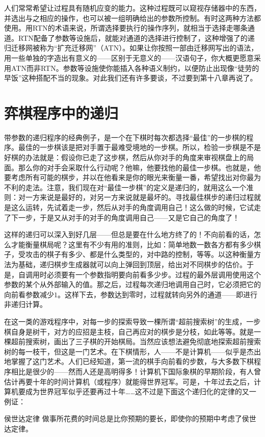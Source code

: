 人们常常希望让过程具有随机应变的能力。这种过程既可以窥视存储器中的东西，并选出与之相应的操作，也可以被一组明确给出的参数所控制。有时这两种方法都使用。用RTN的术语来说，所谓选择要执行的操作序列，就相当于选择走哪条通道。RTN配备了参数等设施后，就能对通道的选择进行控制了，这种增强了的递归迁移网被称为“扩充迁移网”（ATN）。如果让你按照一部由迁移网写出的语法，用一些单独的字造出有意义的——区别于无意义的——汉语句子，你大概更愿意采用ATN而非RTN。参数等设施使你能插入各种语义制约，以便防止出现像“徒劳的早饭”这种搭配不当的现象。对此我们还有许多要谈，不过要到第十八章再说了。

\section{弈棋程序中的递归}

带参数的递归程序的经典例子，是一个在下棋时每次都选择“最佳”的一步棋的程序。最佳的一步棋该是把对手置于最难受境地的一步棋。所以，检验一步棋是不是好棋的办法就是：假设你已走了这步棋，然后从你对手的角度来审视棋盘上的局面。那么你的对手会采取什么行动呢？他嘛，他要找他的最佳一步棋。也就是，他要考虑所有可能的棋步，并以在他看来是你的眼光来衡量一番，希望找出对你最为不利的走法。注意，我们现在对“最佳一步棋”的定义是递归的，就用这么一个准则：对一方来说是最好的，对另一方来说就是最坏的。寻找最佳棋步的递归过程就是这么运转，先试着走一步，然后从对手的角度调用自己！这么做的时候，它试走了下一步，于是又从对手的对手的角度调用自己——又是它自己的角度了！

这样的递归可以深入到好几层——但总是要在什么地方终了的！不向前看的话，怎么才能衡量棋局呢？这里有不少有用的准则，比如：简单地数一数各方都有多少棋子，受攻击的棋子有多少、都是什么类型的，对中路的控制，等等。以这种衡量方法为基础，递归棋步生成器就可以向上弹回到顶层，给出对不同棋步的估价。于是，自调用时必须要有一个参数指明要向前看多少步。过程的最外层调用使用这个参数的某个从外部输入的值。那之后，过程每次递归地调用自己时，它必须把它的向前看参数减少$1$。这样下去，参数达到零时，过程就转向另外的通道——即进行非递归计算。

在这一类的游戏程序中，对每一步的探索导致一棵所谓“超前搜索树”的生成，一步棋自身是树干，对方的应招是主枝，自己再应对的棋步是分枝，如此等等。就是一棵超前搜索树，画出了三子棋的开始棋局。当然应该想法避免彻底地探索超前搜索树的每一枝干，但这是一门艺术。在下棋情形，人——不是计算机——似乎是杰出地掌握了这门艺术。人们已经知道，第一流的棋手向前看的步数，与大多数下棋程序相比是很少的——然而人还是高明得多！计算机下国际象棋的早期阶段，有人曾估计再要十年的时间计算机（或程序）就能得世界冠军。可是，十年过去之后，计算机要成为世界冠军似乎还要再过十年……这不过是下面这个递归化的定律的又一例证：
\begin{thm}{侯世达定律}
做事所花费的时间总是比你预期的要长，即使你的预期中考虑了侯世达定律。
\end{thm}

